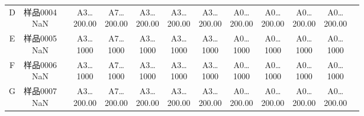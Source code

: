 \documentclass[UTF8,10pt,a4paper,fontset=fandol]{ctexart}
\begin{document}
\begin{center}
\begin{tabular}{c|cccccccccccc}
D & \shortstack{样品0004\\NaN} & & \shortstack{A3\ldots\\200.00} & \shortstack{A7\ldots\\200.00} & \shortstack{A3\ldots\\200.00} & \shortstack{A3\ldots\\200.00} & \shortstack{A3\ldots\\200.00} & \shortstack{A0\ldots\\200.00} & \shortstack{A0\ldots\\200.00} & \shortstack{A0\ldots\\200.00} & \shortstack{A0\ldots\\200.00} &\\
E & \shortstack{样品0005\\NaN} & & \shortstack{A3\ldots\\1000} & \shortstack{A7\ldots\\1000} & \shortstack{A3\ldots\\1000} & \shortstack{A3\ldots\\1000} & \shortstack{A3\ldots\\1000} & \shortstack{A0\ldots\\1000} & \shortstack{A0\ldots\\1000} & \shortstack{A0\ldots\\1000} & \shortstack{A0\ldots\\1000} &\\
F & \shortstack{样品0006\\NaN} & & \shortstack{A3\ldots\\1000} & \shortstack{A7\ldots\\1000} & \shortstack{A3\ldots\\1000} & \shortstack{A3\ldots\\1000} & \shortstack{A3\ldots\\1000} & \shortstack{A0\ldots\\1000} & \shortstack{A0\ldots\\1000} & \shortstack{A0\ldots\\1000} & \shortstack{A0\ldots\\1000} &\\
G & \shortstack{样品0007\\NaN} & & \shortstack{A3\ldots\\200.00} & \shortstack{A7\ldots\\200.00} & \shortstack{A3\ldots\\200.00} & \shortstack{A3\ldots\\200.00} & \shortstack{A3\ldots\\200.00} & \shortstack{A0\ldots\\200.00} & \shortstack{A0\ldots\\200.00} & \shortstack{A0\ldots\\200.00} & \shortstack{A0\ldots\\200.00} &\\

\end{tabular}
\end{center}
\end{document}

